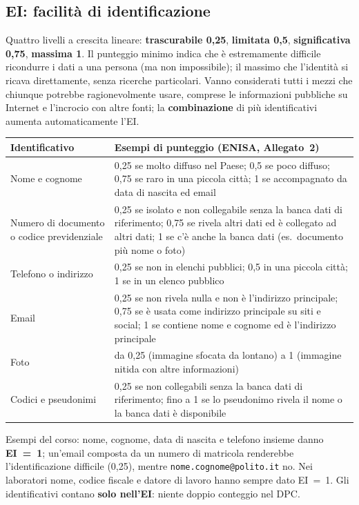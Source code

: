 \subsection{EI: facilità di identificazione}
\label{sec:breach-ei}
Quattro livelli a crescita lineare: \textbf{trascurabile 0,25}, \textbf{limitata 0,5},
\textbf{significativa 0,75}, \textbf{massima 1}. Il punteggio minimo indica che è estremamente difficile
ricondurre i dati a una persona (ma non impossibile); il massimo che l'identità si ricava direttamente,
senza ricerche particolari. Vanno considerati tutti i mezzi che chiunque potrebbe ragionevolmente usare,
comprese le informazioni pubbliche su Internet e l'incrocio con altre fonti; la \textbf{combinazione} di
più identificativi aumenta automaticamente l'EI.
\begin{center}
\small
\begin{tabularx}{\linewidth}{>{\raggedright\arraybackslash}p{3cm} X}
\toprule
\textbf{Identificativo} & \textbf{Esempi di punteggio (ENISA, Allegato~2)}\\
\midrule
Nome e cognome & 0,25 se molto diffuso nel Paese; 0,5 se poco diffuso; 0,75 se raro in una piccola
  città; 1 se accompagnato da data di nascita ed email\\
Numero di documento o codice previdenziale & 0,25 se isolato e non collegabile senza la banca dati di
  riferimento; 0,75 se rivela altri dati ed è collegato ad altri dati; 1 se c'è anche la banca dati (es.\
  documento più nome o foto)\\
Telefono o indirizzo & 0,25 se non in elenchi pubblici; 0,5 in una piccola città; 1 se in un elenco
  pubblico\\
Email & 0,25 se non rivela nulla e non è l'indirizzo principale; 0,75 se è usata come indirizzo
  principale su siti e social; 1 se contiene nome e cognome ed è l'indirizzo principale\\
Foto & da 0,25 (immagine sfocata da lontano) a 1 (immagine nitida con altre informazioni)\\
Codici e pseudonimi & 0,25 se non collegabili senza la banca dati di riferimento; fino a 1 se lo
  pseudonimo rivela il nome o la banca dati è disponibile\\
\bottomrule
\end{tabularx}
\end{center}
Esempi del corso: nome, cognome, data di nascita e telefono insieme danno \textbf{EI~=~1}; un'email
composta da un numero di matricola renderebbe l'identificazione difficile (0,25), mentre
\texttt{nome.cognome@polito.it} no. Nei laboratori nome, codice fiscale e datore di lavoro hanno sempre
dato EI~=~1. Gli identificativi contano \textbf{solo nell'EI}: niente doppio conteggio nel DPC.

